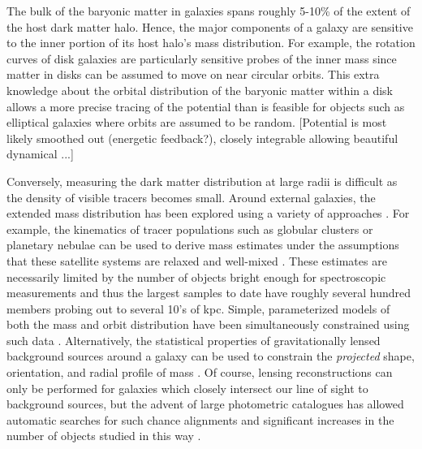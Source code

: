 \documentclass[letterpaper,12pt,preprint]{aastex}
\begin{document}
The bulk of the baryonic matter in galaxies spans roughly 5-10\% of the extent of the host dark matter halo. Hence, the major components of a galaxy are sensitive to the inner portion of its host halo's mass distribution. For example, the rotation curves of disk galaxies are particularly sensitive probes of the inner mass since matter in disks can be assumed to move on near circular orbits. This extra knowledge about the orbital distribution of the baryonic matter within a disk allows a more precise tracing of the potential than is feasible for objects such as elliptical galaxies where orbits are assumed to be random. [Potential is most likely smoothed out (energetic feedback?), closely integrable allowing beautiful dynamical ...]

Conversely, measuring the dark matter distribution at large radii is difficult as the density of visible tracers becomes small. Around external galaxies, the extended mass distribution has been explored using a variety of approaches \citep[see][for a a complete and detailed review]{courteau12}. For example, the kinematics of tracer populations such as globular clusters or planetary nebulae can be used to derive mass estimates under the assumptions that these satellite systems are relaxed and well-mixed \citep[early investigations include][]{mendez01,cote03}. These estimates are necessarily limited by the number of objects bright enough for spectroscopic measurements and thus the largest samples to date have roughly several hundred members probing out to several 10's of kpc. Simple, parameterized models of both the mass and orbit distribution have been simultaneously constrained using such data \citep[e.g.][]{napolitano11,deason12a}. 
Alternatively, the statistical properties of gravitationally lensed background sources around a galaxy can be used to constrain the \emph{projected} shape, orientation, and radial profile of mass \citep[as done by the Lens Structure and Dynamics Survey described in][]{koopmans02}. Of course, lensing reconstructions can only be performed for galaxies which closely intersect our line of sight to background sources, but the advent of large photometric catalogues has allowed automatic searches for such chance alignments and significant increases in the number of objects studied in this way \citep[e.g. the Sloan Lens ACS Survey, see][]{bolton06}.
\end{document}
